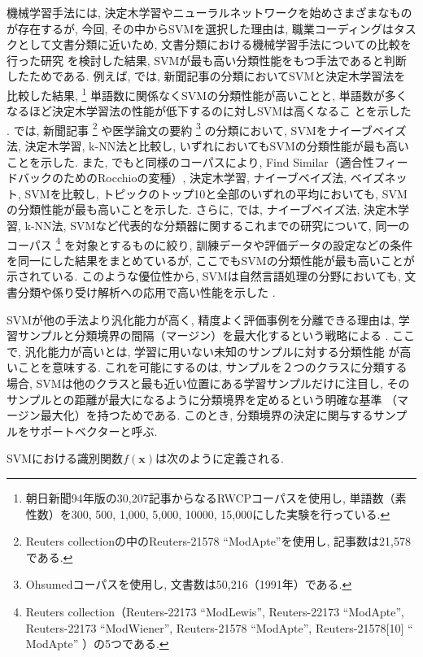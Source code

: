 \documentclass{nlp}
\begin{document}
機械学習手法には, 
決定木学習やニューラルネットワークを始めさまざまなものが存在するが, 
今回, その中からSVMを選択した理由は, 
職業コーディングはタスクとして文書分類に近いため, 
文書分類における機械学習手法についての比較を行った研究\cite{Joachims98,Dumais_et_al98,Taira00,Sebastiani02}
を検討した結果, SVMが最も高い分類性能をもつ手法であると判断したためである. 
例えば, 
\cite{Taira00}
では, 新聞記事の分類においてSVMと決定木学習法を比較した結果, 
\footnote{朝日新聞94年版の30,207記事からなるRWCPコーパスを使用し, 
単語数（素性数）を300, 500, 1,000, 5,000, 10000, 15,000にした実験を行っている. }
単語数に関係なくSVMの分類性能が高いことと, 
単語数が多くなるほど決定木学習法の性能が低下するのに対しSVMは高くなるこ
とを示した
. 
\cite{Joachims98}では, 
新聞記事
\footnote{Reuters collectionの中のReuters-21578 ``ModApte''を使用し, 
記事数は21,578である. } 
や医学論文の要約
\footnote{Ohsumedコーパスを使用し, 文書数は50,216（1991年）である. }
の分類において, SVMをナイーブベイズ法, 決定木学習, k-NN法と比較し, 
いずれにおいてもSVMの分類性能が最も高いことを示した. 
また, 
\cite{Dumais_et_al98}
でも\cite{Joachims98}と同様のコーパスにより, 
Find Similar（適合性フィードバックのためのRocchioの変種）, 決定木学習, 
ナイーブベイズ法, ベイズネット, SVMを比較し, 
トピックのトップ10と全部のいずれの平均においても, 
SVMの分類性能が最も高いことを示した. 
さらに, \cite{Sebastiani02}では, 
ナイーブベイズ法, 決定木学習, k-NN法, SVMなど代表的な分類器に関するこれまでの研究について, 
同一のコーパス
\footnote{Reuters collection（Reuters-22173 ``ModLewis'',  
Reuters-22173 ``ModApte'', Reuters-22173 ``ModWiener'', 
Reuters-21578 ``ModApte'', Reuters-21578[10] `` ModApte''
）の5つである. }
を対象とするものに絞り, 
訓練データや評価データの設定などの条件を同一にした結果をまとめているが, 
ここでもSVMの分類性能が最も高いことが示されている. 
このような優位性から, SVMは自然言語処理の分野においても, 
文書分類や係り受け解析への応用で高い性能を示した
\cite{kudo02}. 

SVMが他の手法より汎化能力が高く, 
精度よく評価事例を分離できる理由は, 
学習サンプルと分類境界の間隔（マージン）を最大化するという戦略による
\cite{Vapnik98}
. 
ここで, 汎化能力が高いとは, 学習に用いない未知のサンプルに対する分類性能
が高いことを意味する. 
これを可能にするのは, サンプルを２つのクラスに分類する場合, 
SVMは他のクラスと最も近い位置にある学習サンプルだけに注目し, 
そのサンプルとの距離が最大になるように分類境界を定めるという明確な基準
（マージン最大化）を持つためである. 
このとき, 
分類境界の決定に関与するサンプルをサポートベクターと呼ぶ. 

SVMにおける識別関数$f(\mathbf{x})$は次のように定義される. 
\end{document}
